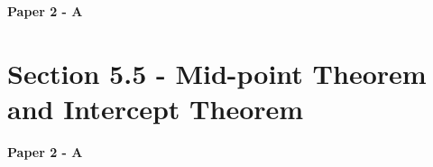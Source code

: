 \documentclass[12pt, a4paper]{article}
\begin{document}
\textbf{Paper 2 - A}
\begin{enumx}[label=\arabic*.,start=23]
\item {}\label{DSE2023-CoreP2-Q21} 
\item {}\label{DSE2024-CoreP2-Q21} 
\end{enumx}




\section*{Section 5.5 - Mid-point Theorem and Intercept Theorem  \NF}\label{section:3-5-5}

\textbf{Paper 2 - A}
\begin{enumx}[label=\arabic*.,start=25]
\item {}\label{DSE2012S-CoreP2-Q23} 
\item {}\label{DSE2019-CoreP2-Q18} 
\item {}\label{DSE2020-CoreP2-Q18} 
\end{enumx}
\end{document}

